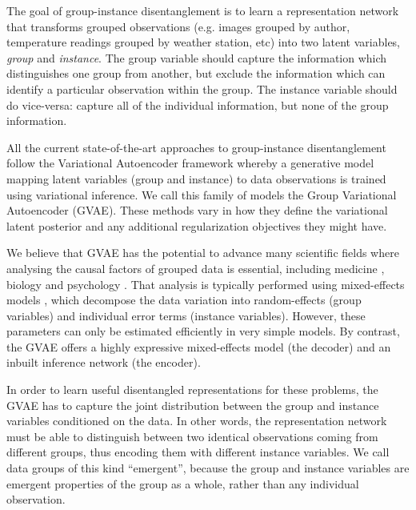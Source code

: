 \documentclass[nohyperref]{article}
\theoremstyle{plain}
\theoremstyle{definition}
\theoremstyle{remark}
\begin{document}
The goal of group-instance disentanglement is to learn a representation network that transforms grouped observations (e.g. images grouped by author,  temperature readings grouped by weather station,  etc) into two latent variables,  \textit{group} and \textit{instance}.  The group variable should capture the information which distinguishes one group from another, but exclude the information which can identify a particular observation within the group. The instance variable should do vice-versa: capture all of the individual information, but none of the group information.

All the current state-of-the-art approaches to group-instance disentanglement \citep{Bouchacourt2018MultiLevelVA,Hosoya2019GroupbasedLO,Shu2020Weakly, Chen2020WeaklySD,Locatello2020WeaklySupervisedDW} follow the Variational Autoencoder framework \citep{Kingma2014AutoEncodingVB,JimenezRezende2014StochasticBA} whereby a generative model mapping latent variables (group and instance) to data observations is trained using variational inference. We call this family of models the Group Variational Autoencoder (GVAE). These methods vary in how they define the variational latent posterior and any additional regularization objectives they might have.

We believe that GVAE has the potential to advance many scientific fields where analysing the causal factors of grouped data is essential, including medicine \citep{Liang1986LongitudinalDA}, biology \citep{Quinn2002ExperimentalDA} and psychology \citep{Schafer2002MissingDO}. That analysis is typically performed using mixed-effects models \citep{Pinheiro2001MixedEffectsMI}, which decompose the data variation into random-effects (group variables) and individual error terms (instance variables). However, these parameters can only be estimated efficiently in very simple models. By contrast, the GVAE offers a highly expressive mixed-effects model (the decoder) and an inbuilt inference network (the encoder).

In order to learn useful disentangled representations for these problems,  the GVAE has to capture the joint distribution between the group and instance variables conditioned on the data. In other words,  the representation network must be able to distinguish between two identical observations coming from different groups, thus encoding them with different instance variables.  We call data groups of this kind ``emergent'', because the group and instance variables are emergent properties of the group as a whole, rather than any individual observation. 
\end{document}
